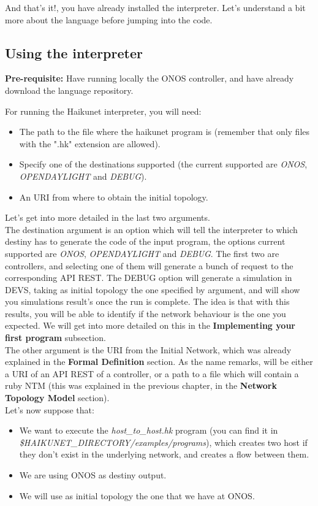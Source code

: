 And that's it!, you have already installed the interpreter. Let's understand a bit more about the language before jumping into the code.

\subsection{Using the interpreter}

\textbf{Pre-requisite:} Have running locally the ONOS controller, and have already download the language repository.

For running the Haikunet interpreter, you will need: 
\begin{itemize}
\item The path to the file where the haikunet program is (remember that only files with the ".hk" extension are allowed).
\item Specify one of the destinations supported (the current supported are \textit{ONOS}, \textit{OPENDAYLIGHT} and \textit{DEBUG}).
\item An URI from where to obtain the initial topology.
\end{itemize}

Let's get into more detailed in the last two arguments.\\
The destination argument is an option which will tell the interpreter to which destiny has to generate the code of the input program, the options current supported are \textit{ONOS}, \textit{OPENDAYLIGHT} and \textit{DEBUG}. The first two are controllers, and selecting one of them will generate a bunch of request to the corresponding API REST. The DEBUG option will generate a simulation in DEVS, taking as initial topology the one specified by argument, and will show you simulations result's once the run is complete. The idea is that with this results, you will be able to identify if the network behaviour is the one you expected. We will get into more detailed on this in the \textbf{Implementing your first program} subsection.\\
The other argument is the URI from the Initial Network, which was already explained in the \textbf{Formal Definition} section. As the name remarks, will be either a URI of an API REST of a controller, or a path to a file which will contain a ruby NTM (this was explained in the previous chapter, in the \textbf{Network Topology Model} section).\\

Let's now suppose that:
\begin{itemize}
\item We want to execute the \textit{host\_to\_host.hk} program (you can find it in \textit{\$HAIKUNET\_DIRECTORY/examples/programs}), which creates two host if they don't exist in the underlying network, and creates a flow between them. 
\item We are using ONOS as destiny output.
\item We will use as initial topology the one that we have at ONOS. 
\end{itemize} 

